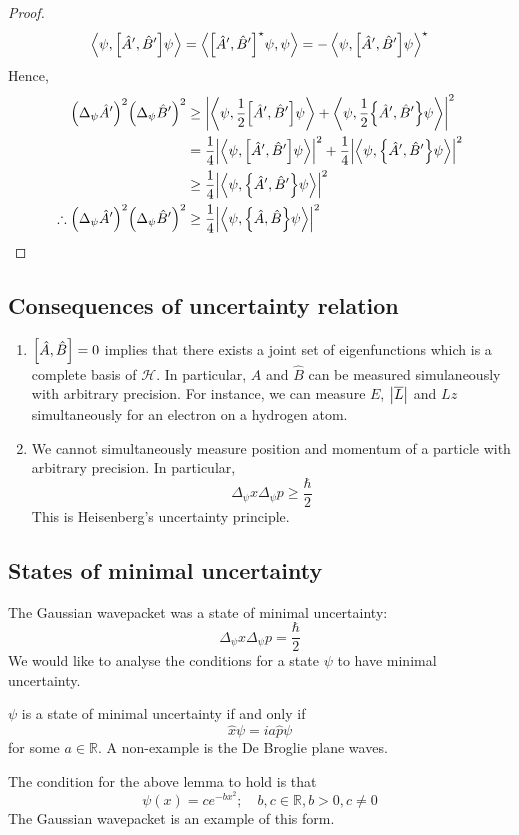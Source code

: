 \begin{proof}
	\[
		\left\langle{\psi, \qty[\hat A', \hat B'] \psi}\right\rangle = \left\langle{\qty[\hat A', \hat B']^\star \psi, \psi}\right\rangle = -\left\langle{\psi, \qty[\hat A', \hat B'] \psi}\right\rangle^\star
	\]
	Hence,
	\begin{align*}
		\qty(\Delta_\psi \hat A')^2 \qty(\Delta_\psi \hat B')^2            & \geq \abs{\left\langle{\psi, \frac{1}{2} \qty[\hat A', \hat B'] \psi}\right\rangle + \left\langle{\psi, \frac{1}{2} \qty{\hat A', \hat B'} \psi}\right\rangle}^2     \\
		                                                                   & = \frac{1}{4} \abs{\left\langle{\psi, \qty[\hat A', \hat B'] \psi}\right\rangle}^2 + \frac{1}{4} \abs{\left\langle{\psi, \qty{\hat A', \hat B'}\psi}\right\rangle}^2 \\
		                                                                   & \geq \frac{1}{4} \abs{\left\langle{\psi, \qty{\hat A', \hat B'} \psi}\right\rangle}^2                                                             \\
		\therefore \qty(\Delta_\psi \hat A')^2 \qty(\Delta_\psi \hat B')^2 & \geq \frac{1}{4} \abs{\left\langle{\psi, \qty{\hat A, \hat B} \psi}\right\rangle}^2
	\end{align*}
\end{proof}

\subsection{Consequences of uncertainty relation}
\begin{enumerate}
	\item \( \qty[\hat A, \hat B] = 0 \) implies that there exists a joint set of eigenfunctions which is a complete basis of \( \mathcal H \).
	      In particular, \( \hat A \) and \( \hat B \) can be measured simulaneously with arbitrary precision.
	      For instance, we can measure \( E \), \( \abs{\overline L} \) and \( L z \) simultaneously for an electron on a hydrogen atom.
	\item We cannot simultaneously measure position and momentum of a particle with arbitrary precision.
	      In particular,
	      \[
		      \Delta_\psi x \Delta_\psi p \geq \frac{\hbar}{2}
	      \]
	      This is Heisenberg's uncertainty principle.
\end{enumerate}

\subsection{States of minimal uncertainty}
The Gaussian wavepacket was a state of minimal uncertainty:
\[
	\Delta_\psi x \Delta_\psi p = \frac{\hbar}{2}
\]
We would like to analyse the conditions for a state \( \psi \) to have minimal uncertainty.
\begin{lemma}
	\( \psi \) is a state of minimal uncertainty if and only if
	\[
		\hat x \psi = i a \hat p \psi
	\]
	for some \( a \in \mathbb R \).
	A non-example is the De Broglie plane waves.
\end{lemma}
\begin{lemma}
	The condition for the above lemma to hold is that
	\[
		\psi(x) = ce^{-bx^2};\quad b,c \in \mathbb R, b > 0, c \neq 0
	\]
	The Gaussian wavepacket is an example of this form.
\end{lemma}

